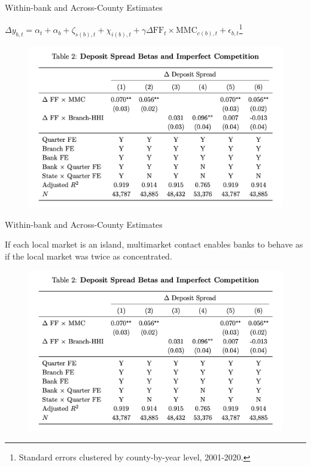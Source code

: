 \documentclass[notes,10.2pt, aspectratio=169]{beamer}
\newenvironment{wideitemize}{\itemize\addtolength{\itemsep}{10pt}}{\enditemize}
\begin{document}
\begin{frame}{Within-bank and Across-County Estimates}
  \vspace{0.1cm}
  \begin{wideitemize}
  \item $\Delta y_{b, t}=\alpha_t+\alpha_b+\zeta_{s(b), t}+\chi_{i(b), t}+\gamma \Delta \mathrm{FF}_t \times \mathrm{MMC}_{c(b), t}+\epsilon_{b, t}$\footnote{Standard errors clustered by county-by-year level, 2001-2020.}
  

\begin{figure}[t*]
  \centering
  \includegraphics[width=.68\textwidth]{./imgs/table2.png}
\end{figure}

\end{wideitemize}

\end{frame}

\begin{frame}{Within-bank and Across-County Estimates}
  \vspace{0.1cm}
  \begin{wideitemize}
  \item If each local market is an island, multimarket contact enables banks to behave as if the local market was twice as concentrated. 
  

\begin{figure}[t*]
  \centering
  \includegraphics[width=.68\textwidth]{./imgs/table2.png}
\end{figure}

\end{wideitemize}

\end{frame}
\end{document}
